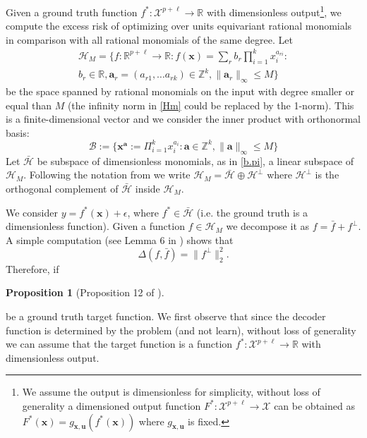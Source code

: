 \documentclass[nohyperref]{article}
\theoremstyle{plain}
\newtheorem{proposition}[theorem]{Proposition}
\theoremstyle{definition}
\theoremstyle{remark}
\begin{document}
Given a ground truth function $f^*: \mathcal X^{p+\ell} \to \mathbb R$ with dimensionless output\footnote{We assume the output is dimensionless for simplicity, without loss of generality a dimensioned output function $F^*:\mathcal X^{p+\ell} \to \mathcal X$ can be obtained as $F^*(\mathbf x)=g_{\mathbf x,\mathbf u}(f^*(\mathbf x))$ where $g_{\mathbf x,\mathbf u}$ is fixed.}, we compute the excess risk of optimizing over units equivariant rational monomials in comparison with all rational monomials of the same degree. 
Let 
\begin{multline}\mathcal H_M =\Big\{f:\mathbb R^{p+\ell}\to \mathbb R: f(\mathbf x) = \sum_{r} b_r \prod_{i=1}^k x_i^{a_{ri}}: 
\\ b_r\in \mathbb R, \mathbf a_r=(a_{r1},\ldots a_{rk})\in \mathbb Z^k,  \|\mathbf a_{r}\|_\infty\leq M \Big\} \label{Hm}
\end{multline}
be the space spanned by rational monomials on the input with degree smaller or equal than $M$ (the infinity norm in \ref{Hm} could be replaced by the 1-norm). This is a finite-dimensional vector and we consider the inner product with orthonormal basis: 
\begin{equation}
\mathcal B:=\{\mathbf x^{\mathbf a}:= \Pi_{i=1}^k x_i^{a_i}: \mathbf a \in \mathbb Z^k, \|\mathbf a \|_\infty \leq M \}
\end{equation} 
Let $\bar {\mathcal H} $ be subspace of dimensionless monomials, as in \eqref{b.pi}, a linear subspace of $\mathcal H_M$. Following the notation from \citealt{elesedy_kernel} we write $\mathcal H_M = \bar {\mathcal H} \oplus \mathcal H^\perp$ where $\mathcal H^\perp$ is the orthogonal complement of $\bar {\mathcal H}$ inside $\mathcal H_M$.

We consider $y = f^*(\mathbf x) + \epsilon$, where $f^*\in \bar {\mathcal H}$ (i.e. the ground truth is a dimensionless function). Given a function $f\in \mathcal H_M$ we decompose it as $f=\bar f + f^\perp$.
A simple computation (see Lemma 6 in \citealt{elesedy2021provably}) shows that
\begin{equation}
    \Delta(f, \bar f) = \|f^\perp \|_2^2.
\end{equation}
Therefore, if 

\begin{proposition}[Proposition 12 of \cite{elesedy2021provably}]

\end{proposition}

be a ground truth target function. We first observe that since the decoder function is determined by the problem (and not learn), without loss of generality we can assume that the target function is a function $f^*:\mathcal X^{p+\ell} \to \mathbb R$ with dimensionless output. 
\end{document}
